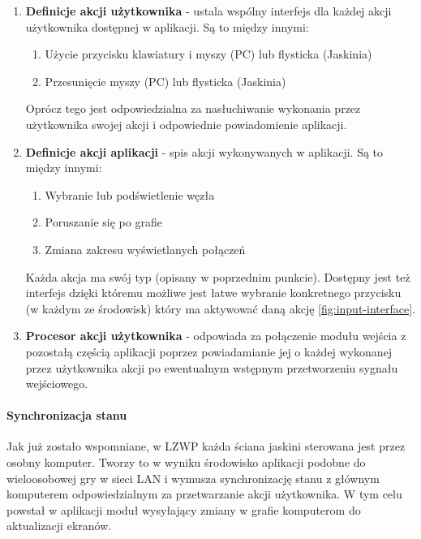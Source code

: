 \begin{enumerate}[label=\textbullet]
	\item \textbf{Definicje akcji użytkownika} - ustala wspólny interfejs dla każdej akcji użytkownika dostępnej w aplikacji. Są to między innymi: 
	\begin{enumerate}[label=\textbullet]
		\item Użycie przycisku klawiatury i myszy (PC) lub flysticka (Jaskinia)
		\item Przesunięcie myszy (PC) lub flysticka (Jaskinia)
	\end{enumerate}
	Oprócz tego jest odpowiedzialna za nasłuchiwanie wykonania przez użytkownika swojej akcji i odpowiednie powiadomienie aplikacji.
	
	\item \textbf{Definicje akcji aplikacji} - spis akcji wykonywanych w aplikacji. Są to między innymi: 
	\begin{enumerate}[label=\textbullet]
		\item Wybranie lub podświetlenie węzła
		\item Poruszanie się po grafie
		\item Zmiana zakresu wyświetlanych połączeń
	\end{enumerate}
	Każda akcja ma swój typ (opisany w poprzednim punkcie). Dostępny jest też interfejs dzięki któremu możliwe jest łatwe wybranie konkretnego przycisku (w każdym ze środowisk) który ma aktywować daną akcję \ref{fig:input-interface}.
	
	\item \textbf{Procesor akcji użytkownika} - odpowiada za połączenie modułu wejścia z pozostałą częścią aplikacji poprzez powiadamianie jej o każdej wykonanej przez użytkownika akcji po ewentualnym wstępnym przetworzeniu sygnału wejściowego.
\end{enumerate}


\paragraph{Synchronizacja stanu}
Jak już zostało wspomniane, w LZWP każda ściana jaskini sterowana jest przez osobny komputer. Tworzy to w wyniku środowisko aplikacji podobne do wieloosobowej gry w sieci LAN i wymusza synchronizację stanu z głównym komputerem odpowiedzialnym za przetwarzanie akcji użytkownika. W tym celu powstał w aplikacji moduł wysyłający zmiany w grafie komputerom do aktualizacji ekranów. 

